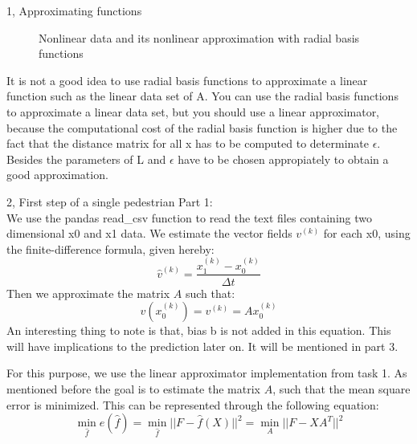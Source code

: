 \documentclass[10pt,a4paper]{article}
\begin{document}
\begin{task}{1, Approximating functions}
\begin{figure}[H]
\caption{Nonlinear data and its nonlinear approximation with radial basis functions}
\label{fig:task1_3}
\end{figure}
It is not a good idea to use radial basis functions to approximate a linear function such as the linear data set of A. You can use the radial basis functions to approximate a linear data set, but you should use a linear approximator, because the computational cost of the radial basis function is higher due to the fact that the distance matrix for all x has to be computed to determinate $\epsilon$. Besides the parameters of L and $\epsilon$ have to be chosen appropiately to obtain a good approximation.
\end{task}

\begin{task}{2, First step of a single pedestrian}
Part 1: \\
We use the pandas read\_csv function to read the text files containing two dimensional x0 and x1 data. We estimate the vector fields $v^{(k)}$ for each x0, using the finite-difference formula, given hereby:
\begin{equation*}
\hat{v}^{(k)} = \frac{x_1^{(k)} - x_0^{(k)}}{\Delta t}
\end{equation*}
Then we approximate the matrix $A$ such that:
\begin{equation*}
v(x_0^{(k)}) = v^{(k)} = Ax_0^{(k)}
\end{equation*}
An interesting thing to note is that, bias b is not added in this equation. This will have implications to the prediction later on. It will be mentioned in part 3.

For this purpose, we use the linear approximator implementation from task 1. As mentioned before the goal is to estimate the matrix $A$, such that the mean square error is minimized. This can be represented through the following equation:
\begin{equation*}
\min_{\hat{f}}e(\hat{f}) = \min_{\hat{f}}||F-\hat{f}(X)||^2 = \min_{A}||F-XA^T||^2
\end{equation*} \\


\end{task}
\end{document}
